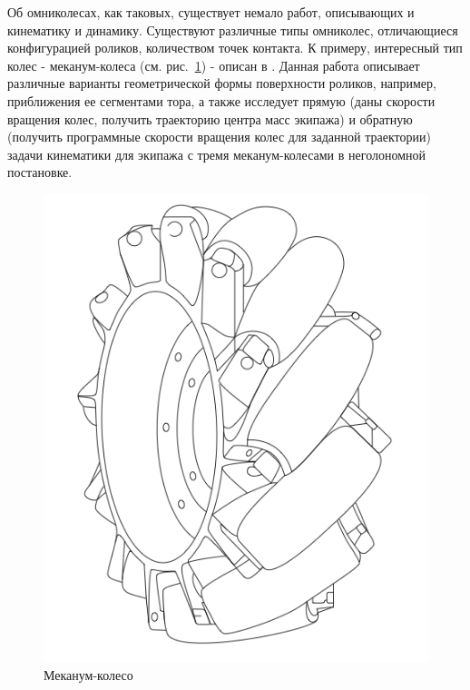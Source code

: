 \documentclass[12pt]{article}
\begin{document}
Об омниколесах, как таковых, существует немало работ, описывающих и кинематику и динамику. Существуют различные типы омниколес, отличающиеся конфигурацией роликов, количеством точек контакта. К примеру, интересный тип колес - меканум-колеса (см. рис.~\ref{fig:bor_wheel_pic}) - описан в \cite{mecanum}. Данная работа описывает различные варианты геометрической формы поверхности роликов, например, приближения ее сегментами тора, а также исследует прямую (даны скорости вращения колес, получить траекторию центра масс экипажа) и обратную (получить программные скорости вращения колес для заданной траектории) задачи кинематики для экипажа с тремя меканум-колесами в неголономной постановке.\\

\begin{figure}
\centering
\begin{minipage}{.47\textwidth}
    \centering
    \includegraphics[width=\textwidth]{content/parts/3_friction/diploma/img/art/bor_wheel_pic.png}
    \caption{Меканум-колесо}
    \label{fig:bor_wheel_pic}
\end{minipage}%

\end{figure}
\end{document}

